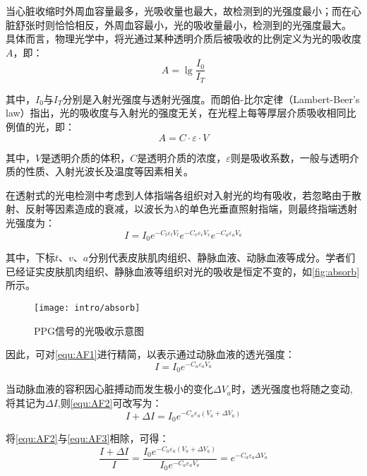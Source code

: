 当心脏收缩时外周血容量最多，光吸收量也最大，故检测到的光强度最小；而在心脏舒张时则恰恰相反，外周血容最小，光的吸收量最小，检测到的光强度最大\cite{lhc,cwl}。
具体而言，物理光学中，将光通过某种透明介质后被吸收的比例定义为光的吸收度$A$，即：
\begin{equation}
    \label{equ:LBL}
    A=\lg\frac{I_{0}}{I_{T}}
\end{equation}

其中，$I_{0}$与$I_{T}$分别是入射光强度与透射光强度。而朗伯-比尔定律（Lambert-Beer's law）指出，光的吸收度与入射光的强度无关，在光程上每等厚层介质吸收相同比例值的光，即：
\begin{equation}
    \label{equ:LBL2}
    A=C \cdot \varepsilon \cdot V
\end{equation}

其中，$V$是透明介质的体积，$C$是透明介质的浓度，$\varepsilon$则是吸收系数，一般与透明介质的性质、入射光波长及温度等因素相关。

在透射式的光电检测中考虑到人体指端各组织对入射光的均有吸收，若忽略由于散射、反射等因素造成的衰减，以波长为$\lambda$的单色光垂直照射指端，则最终指端透射光强度为\cite{4122392}：
\begin{equation}
    \label{equ:AF1}
    I=I_{0}e^{-C_{t}\varepsilon _{t}V_{t}}e^{-C_{v}\varepsilon _{v}V_{v}} e^{-C_{a}\varepsilon _{a}V_{a}} 
\end{equation}

其中，下标$t$、$v$、$a$分别代表皮肤肌肉组织、静脉血液、动脉血液等成分。学者们已经证实皮肤肌肉组织、静脉血液等组织对光的吸收是恒定不变的\cite{1980Spectrophotometric,4122392}，如\autoref{fig:absorb}所示。
\begin{figure}[htbp]
    \centering
    \texttt{[image: intro/absorb]}
    \caption{\label{fig:absorb}PPG信号的光吸收示意图}
\end{figure}
因此，可对\autoref{equ:AF1}进行精简，以表示通过动脉血液的透光强度\cite{PPGYY}：
\begin{equation}
    \label{equ:AF2}
    I=I_{0}e^{-C_{a}\varepsilon _{a}V_{a}} 
\end{equation}

当动脉血液的容积因心脏搏动而发生极小的变化$\Delta V_{a}$时，透光强度也将随之变动,将其记为$\Delta I$,则\autoref{equ:AF2}可改写为：
\begin{equation}
    \label{equ:AF3}
    I+\Delta I=I_{0}e^{-C_{a}\varepsilon _{a}(V_{a}+\Delta V_{a})} 
\end{equation}

将\autoref{equ:AF2}与\autoref{equ:AF3}相除，可得：
\begin{equation}
    \label{equ:AF4}
    \frac{I+\Delta I}{I}=\frac{I_{0}e^{-C_{a}\varepsilon _{a}(V_{a}+\Delta V_{a})}}{I_{0}e^{-C_{a}\varepsilon _{a}V_{a}}}=e^{-C_{a}\varepsilon _{a}\Delta V_{a}} 
\end{equation}

